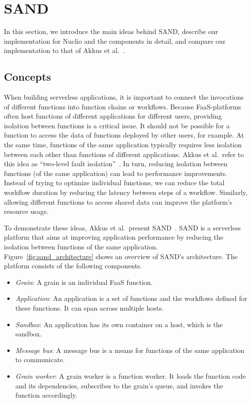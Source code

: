 \section{SAND}\label{sec:sand}

In this section, we introduce the main ideas behind SAND, describe our implementation for Nuclio and the components in detail, and compare our implementation to that of Akkus et al.~\cite{akkus2018sand}.

\subsection{Concepts}

When building serverless applications, it is important to connect the invocations of different functions into function chains or workflows.
Because FaaS-platforms often host functions of different applications for different users, providing isolation between functions is a critical issue.
It should not be possible for a function to access the data of functions deployed by other users, for example.
At the same time, functions of the same application typically requires less isolation between each other than functions of different applications.
Akkus et al.~refer to this idea as \enquote{two-level fault isolation}~\cite{akkus2018sand}.
In turn, reducing isolation between functions (of the same application) can lead to performance improvements.
Instead of trying to optimize individual functions, we can reduce the total workflow duration by reducing the latency between steps of a workflow.
Similarly, allowing different functions to access shared data can improve the platform's resource usage. 

To demonstrate these ideas, Akkus et al.~present SAND~\cite{akkus2018sand}.
SAND is a serverless platform that aims at improving application performance by reducing the isolation between functions of the same application.
Figure~\ref{fig:sand_architecture} shows an overview of SAND's architecture.
The platform consists of the following components.
\begin{itemize}
    \item \emph{Grain}: A grain is an individual FaaS function.
    \item \emph{Application}: An application is a set of functions and the workflows defined for these functions. It can span across multiple hosts.
    \item \emph{Sandbox}: An application has its own container on a host, which is the sandbox. 
    \item \emph{Message bus}: A message bus is a means for functions of the same application to communicate. 
    \item \emph{Grain worker}: A grain worker is a function worker. It loads the function code and its dependencies, subscribes to the grain's queue, and invokes the function accordingly.
\end{itemize}

